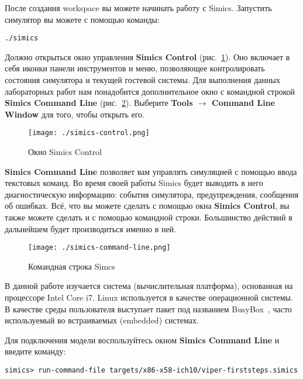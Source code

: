 После создания workspace вы можете начинать работу с Simics. Запустить симулятор вы можете с помощью команды:

\begin{lstlisting}
./simics
\end{lstlisting}

Должно открыться окно управления \textbf{Simics Control} (рис.~\ref{fig:simics-control}). Оно включает в себя иконки панели инструментов и меню, позволяющее контролировать состояния симулятора и текущей гостевой системы. Для выполнения данных лабораторных работ нам понадобится дополнительное окно с командной строкой \textbf{Simics Command Line} (рис.~\ref{fig:simics-command-line}). Выберите \textbf{Tools $\to$ Command Line Window} для того, чтобы открыть его.

\begin{figure}[ht]
    \centering
    \texttt{[image: ./simics-control.png]}
    \caption{Окно Simics Control}
    \label{fig:simics-control}
\end{figure}

\textbf{Simics Command Line} позволяет вам управлять симуляцией с помощью ввода текстовых команд. Во время своей работы Simics будет выводить в него диагностическую информацию: события симулятора, предупреждения, сообщения об ошибках. Всё, что вы можете сделать с помощью окна \textbf{Simics Control}, вы также можете сделать и с помощью командной строки. Большинство действий в дальнейшем будет производиться именно в ней.

\begin{figure}[ht]
    \centering
    \texttt{[image: ./simics-command-line.png]}
    \caption{Командная строка Simcs}
    \label{fig:simics-command-line}
\end{figure}

В данной работе изучается система (вычислительная платформа), основанная на процессоре Intel\textsuperscript{\textregistered} Core\textsuperscript{\texttrademark} i7. Linux используется в качестве операционной системы. В качестве среды пользователя выступает пакет под названием BusyBox~\cite{BusyBox}, часто используемый во встраиваемых (\abbr embedded) системах.

Для подключения модели воспользуйтесь окном \textbf{Simics Command Line} и введите команду:

\begin{lstlisting}
simics> run-command-file targets/x86-x58-ich10/viper-firststeps.simics
\end{lstlisting}

